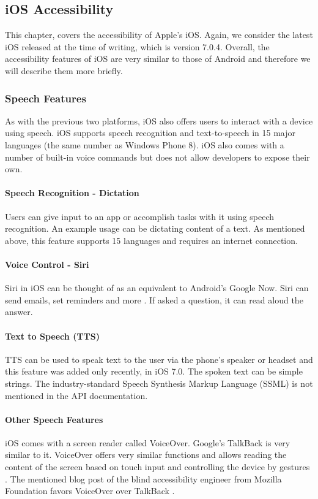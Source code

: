 \subsection{iOS Accessibility}
This chapter, covers the accessibility of Apple's iOS. Again, we consider the latest iOS released at the time of writing, which is version 7.0.4. Overall, the accessibility features of iOS are very similar to those of Android and therefore we will describe them more briefly.

\subsubsection{Speech Features}
As with the previous two platforms, iOS also offers users to interact with a device using speech. iOS supports speech recognition and text-to-speech in 15 major languages (the same number as Windows Phone 8).
iOS also comes with a number of built-in voice commands \cite{iosAccbility} but does not allow developers to expose their own.

\paragraph{Speech Recognition - Dictation}
Users can give input to an app or accomplish tasks with it using speech recognition. An example usage can be dictating content of a text. As mentioned above, this feature supports 15 languages and requires an internet connection.

\paragraph{Voice Control - Siri}
Siri in iOS can be thought of as an equivalent to Android's Google Now. Siri can send emails, set reminders and more \cite{iosAccbility}. If asked a question, it can read aloud the answer. 

\paragraph{Text to Speech (TTS)}
TTS can be used to speak text to the user via the phone's speaker or headset and this feature was added only recently, in iOS 7.0. The spoken text can be simple strings. The industry-standard Speech Synthesis Markup Language (SSML) is not mentioned in the API documentation.

\paragraph{Other Speech Features}
iOS comes with a screen reader called VoiceOver. Google's TalkBack is very similar to it. VoiceOver offers very similar functions and allows reading the content of the screen based on touch input and controlling the device by gestures \cite{iosVoiceOver}.
The mentioned blog post of the blind accessibility engineer from Mozilla Foundation favors VoiceOver over TalkBack \cite{mozillaguy}.

